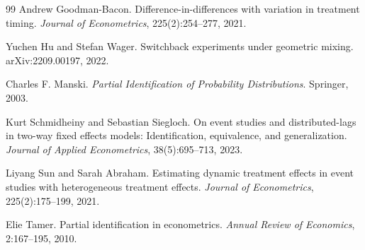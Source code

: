 \documentclass[11pt]{article}
\theoremstyle{definition}
\theoremstyle{plain}
\theoremstyle{remark}
\begin{document}
\begin{thebibliography}{99}
Andrew Goodman-Bacon.
\newblock Difference-in-differences with variation in treatment timing.
\newblock \emph{Journal of Econometrics}, 225(2):254--277, 2021.

Yuchen Hu and Stefan Wager.
\newblock Switchback experiments under geometric mixing.
\newblock arXiv:2209.00197, 2022.

Charles F. Manski.
\newblock \emph{Partial Identification of Probability Distributions}.
\newblock Springer, 2003.

Kurt Schmidheiny and Sebastian Siegloch.
\newblock On event studies and distributed-lags in two-way fixed effects models: Identification, equivalence, and generalization.
\newblock \emph{Journal of Applied Econometrics}, 38(5):695--713, 2023.

Liyang Sun and Sarah Abraham.
\newblock Estimating dynamic treatment effects in event studies with heterogeneous treatment effects.
\newblock \emph{Journal of Econometrics}, 225(2):175--199, 2021.

Elie Tamer.
\newblock Partial identification in econometrics.
\newblock \emph{Annual Review of Economics}, 2:167--195, 2010.
\end{thebibliography}
\end{document}
